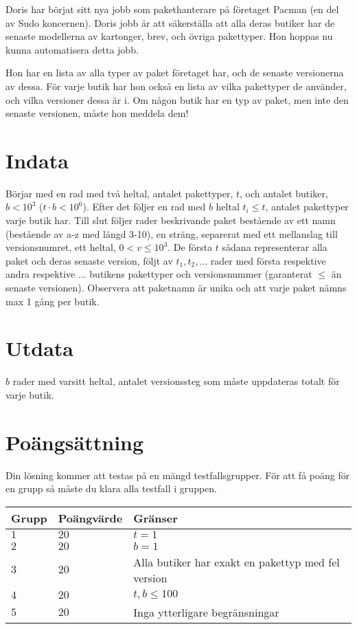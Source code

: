 \noindent
Doris har börjat sitt nya jobb som pakethanterare på företaget Pacman (en del av Sudo koncernen). Doris jobb är att säkerställa att alla deras butiker har de senaste modellerna av kartonger, brev, och övriga pakettyper. Hon hoppas nu kunna automatisera detta jobb.

\noindent
Hon har en lista av alla typer av paket företaget har, och de senaste versionerna av dessa. För varje butik har hon också en lista av vilka pakettyper de använder, och vilka versioner dessa är i. Om någon butik har en typ av paket, men inte den senaste versionen, måste hon meddela dem! 

\section*{Indata}
\noindent
Börjar med en rad med två heltal, antalet pakettyper, $t$,  och antalet butiker, $b < 10^3$ ($t \cdot b < 10^6$). Efter det följer en rad med $b$ heltal $t_i \leq t$, antalet pakettyper varje butik har. Till slut följer rader beskrivande paket bestående av ett namn (bestående av a-z med längd 3-10), en sträng, separerat med ett mellanslag till versionsnumret, ett heltal, $0 < v \leq 10^3$. De första $t$ sådana representerar alla paket och deras senaste version, följt av $t_1, t_2, \dots$ rader med första respektive andra respektive $\dots$ butikens pakettyper och versionsnummer (garanterat $\leq$ än senaste versionen). Observera att paketnamn är unika och att varje paket nämns max 1 gång per butik.

\section*{Utdata}
\noindent
$b$ rader med varsitt heltal, antalet versionssteg som måste uppdateras totalt för varje butik.

\section*{Poängsättning}
\noindent
Din lösning kommer att testas på en mängd testfallsgrupper.
För att få poäng för en grupp så måste du klara alla testfall i gruppen.

\noindent
\begin{tabular}{| l | l | l |}
\hline
  Grupp & Poängvärde & Gränser \\ \hline
  $1$    & $20$       &  $t = 1$ \\ \hline 
  $2$    & $20$       &  $b = 1$ \\ \hline
  $3$    & $20$       &  Alla butiker har exakt en pakettyp med fel version \\ \hline
  $4$    & $20$       &  $t, b \leq 100$ \\ \hline
  $5$    & $20$       &  Inga ytterligare begränsningar \\ \hline
\end{tabular}
